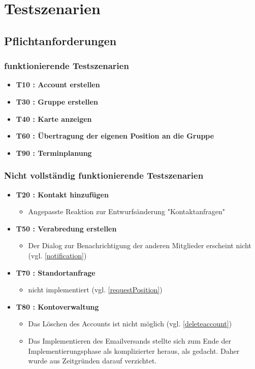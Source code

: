 \documentclass[parskip=full,11pt]{scrartcl}
\begin{document}
\section{Testszenarien}

	\subsection{Pflichtanforderungen}
		\subsubsection{funktionierende Testszenarien}
			\begin{itemize}
				\item \textbf{T10 : Account erstellen}
				\item \textbf{T30 : Gruppe erstellen}
                \item \textbf{T40 : Karte anzeigen}
				\item \textbf{T60 : Übertragung der eigenen Position an die Gruppe}
				\item \textbf{T90 : Terminplanung}
			\end{itemize}

		\subsubsection{Nicht vollständig funktionierende Testszenarien}
			\begin{itemize}
				\item \textbf{T20 : Kontakt hinzufügen}
					\begin{itemize}
						\item Angepasste Reaktion zur Entwurfsänderung "Kontaktanfragen"
					\end{itemize}
				\item \textbf{T50 : Verabredung erstellen}
					\begin{itemize}
						\item Der Dialog zur Benachrichtigung der anderen
                        Mitglieder erscheint nicht (vgl. \ref{notification})
					\end{itemize}
				\item \textbf{T70 : Standortanfrage}
					\begin{itemize}
						\item nicht implementiert (vgl. \ref{requestPosition})
					\end{itemize}
				\item \textbf{T80 : Kontoverwaltung}
					\begin{itemize}
            \item Das Löschen des Accounts ist nicht möglich
									(vgl. \ref{deleteaccount})
          	\item Das Implementieren des Emailversands stellte sich
                  zum Ende der Implementierungsphase als
                  komplizierter heraus, als gedacht. Daher wurde aus
                  Zeitgründen darauf verzichtet.
					\end{itemize}
				\end{itemize}
\end{document}
